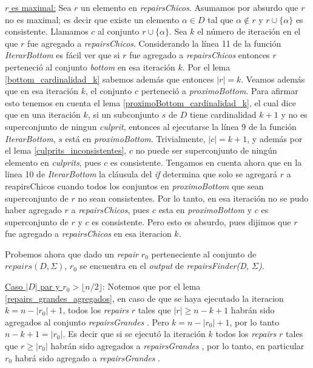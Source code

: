 \documentclass[11pt,a4paper,twoside]{tesis}
\newcommand{\parteEntera}{\lfloor n/2 \rfloor}
\newcommand{\reapairs}{\textit{repairs }}
\newcommand{\reapairsGrandes}{\textit{repairsGrandes }}
\begin{document}
\underline{$r$ es maximal:} Sea $r$ un elemento en \textit{repairsChicos}. Asumamos por absurdo que $r$ no es maximal; es decir que existe un elemento $\alpha \in D$ tal que $\alpha \not\in r$ y $r \cup \{\alpha\}$ es consistente. Llamamos $c$ al conjunto $r \cup \{\alpha\}$. Sea $k$ el número de iteración en el que $r$ fue agregado a \textit{repairsChicos}. Considerando la línea 11 de la función \textit{IterarBottom} es fácil ver que si $r$ fue agregado a \textit{repairsChicos} entonces $r$ perteneció al conjunto \textit{bottom} en esa iteración $k$. Por el lema \ref{bottom_cardinalidad_k} sabemos además que entonces $|r| = k$. Veamos además que en esa iteración $k$, el conjunto $c$ perteneció a \textit{proximoBottom}. Para afirmar esto tenemos en cuenta el lema \ref{proximoBottom_cardinalidad_k}, el cual dice que en una iteración $k$, si un subconjunto $s$ de $D$ tiene cardinalidad $k+1$ y no es superconjunto de ningun \textit{culprit}, entonces al ejecutarse la línea 9 de la función \textit{IterarBottom}, $s$ está en \textit{proximoBottom}. Trivialmente, $|c| = k+1$, y además por el lema \ref{culprits_inconsistentes}, $c$ no puede ser superconjunto de ningún elemento en \textit{culprits}, pues $c$ es consistente.
Tengamos en cuenta ahora que en la linea 10 de \textit{IterarBottom} la cláusula del \textit{if} determina que solo se agregará $r$ a reapirsChicos cuando todos los conjuntos en \textit{proximoBottom} que sean superconjunto de $r$ no sean consistentes. Por lo tanto, en esa iteración no se pudo haber agregado $r$ a \textit{repairsChicos}, pues $c$ esta en \textit{proximoBottom} y $c$ es superconjunto de $r$ y $c$ es consistente. Pero esto es absurdo, pues dijimos que $r$ fue agregado a \textit{repairsChicos} en esa iteracion $k$.

Probemos ahora que dado un \textit{repair} $r_0$ perteneciente al conjunto de $repairs(D, \Sigma)$, $r_0$ se encuentra en el \textit{output} de \textit{repairsFinder(D, $\Sigma$)}.

\underline{Caso $|D|$ par y $r_0 > \parteEntera$}: Notemos que por el lema \ref{repairs_grandes_agregados}, en caso de que se haya ejecutado la iteracion $k = n - |r_0| + 1$, todos los \reapairs $r$ tales que $|r| \geq n - k + 1$ habrán sido agregados al conjunto \reapairsGrandes. Pero $k = n - |r_0| + 1$, por lo tanto $n - k + 1 = |r_0|$. Es decir que si se ejecutó la iteración $k$ todos los \reapairs $r$ tales que $r \geq |r_0|$ habrán sido agregados a \reapairsGrandes, por lo tanto, en particular $r_0$ habrá sido agregado a \reapairsGrandes.
\end{document}
